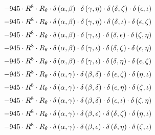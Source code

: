 \begin{subequations}
\begin{gather}
 \\[0.2em] \notag 		 - 945 \cdot R^{8} \cdot R_{\theta{}} \cdot \delta{}\left(\alpha{}, \beta{}\right) \cdot \delta{}\left(\gamma{}, \eta{}\right) \cdot \delta{}\left(\delta{}, \zeta{}\right) \cdot \delta{}\left(\epsilon{}, \iota{}\right) 
 \\[0.2em] \notag 		 - 945 \cdot R^{8} \cdot R_{\theta{}} \cdot \delta{}\left(\alpha{}, \beta{}\right) \cdot \delta{}\left(\gamma{}, \eta{}\right) \cdot \delta{}\left(\delta{}, \iota{}\right) \cdot \delta{}\left(\epsilon{}, \zeta{}\right) 
 \\[0.2em] \notag 		 - 945 \cdot R^{8} \cdot R_{\theta{}} \cdot \delta{}\left(\alpha{}, \beta{}\right) \cdot \delta{}\left(\gamma{}, \iota{}\right) \cdot \delta{}\left(\delta{}, \epsilon{}\right) \cdot \delta{}\left(\zeta{}, \eta{}\right) 
 \\[0.2em] \notag 		 - 945 \cdot R^{8} \cdot R_{\theta{}} \cdot \delta{}\left(\alpha{}, \beta{}\right) \cdot \delta{}\left(\gamma{}, \iota{}\right) \cdot \delta{}\left(\delta{}, \zeta{}\right) \cdot \delta{}\left(\epsilon{}, \eta{}\right) 
 \\[0.2em] \notag 		 - 945 \cdot R^{8} \cdot R_{\theta{}} \cdot \delta{}\left(\alpha{}, \beta{}\right) \cdot \delta{}\left(\gamma{}, \iota{}\right) \cdot \delta{}\left(\delta{}, \eta{}\right) \cdot \delta{}\left(\epsilon{}, \zeta{}\right) 
 \\[0.2em] \notag 		 - 945 \cdot R^{8} \cdot R_{\theta{}} \cdot \delta{}\left(\alpha{}, \gamma{}\right) \cdot \delta{}\left(\beta{}, \delta{}\right) \cdot \delta{}\left(\epsilon{}, \zeta{}\right) \cdot \delta{}\left(\eta{}, \iota{}\right) 
 \\[0.2em] \notag 		 - 945 \cdot R^{8} \cdot R_{\theta{}} \cdot \delta{}\left(\alpha{}, \gamma{}\right) \cdot \delta{}\left(\beta{}, \delta{}\right) \cdot \delta{}\left(\epsilon{}, \eta{}\right) \cdot \delta{}\left(\zeta{}, \iota{}\right) 
 \\[0.2em] \notag 		 - 945 \cdot R^{8} \cdot R_{\theta{}} \cdot \delta{}\left(\alpha{}, \gamma{}\right) \cdot \delta{}\left(\beta{}, \delta{}\right) \cdot \delta{}\left(\epsilon{}, \iota{}\right) \cdot \delta{}\left(\zeta{}, \eta{}\right) 
 \\[0.2em] \notag 		 - 945 \cdot R^{8} \cdot R_{\theta{}} \cdot \delta{}\left(\alpha{}, \gamma{}\right) \cdot \delta{}\left(\beta{}, \epsilon{}\right) \cdot \delta{}\left(\delta{}, \zeta{}\right) \cdot \delta{}\left(\eta{}, \iota{}\right) 
 \\[0.2em] \notag 		 - 945 \cdot R^{8} \cdot R_{\theta{}} \cdot \delta{}\left(\alpha{}, \gamma{}\right) \cdot \delta{}\left(\beta{}, \epsilon{}\right) \cdot \delta{}\left(\delta{}, \eta{}\right) \cdot \delta{}\left(\zeta{}, \iota{}\right) 

\end{gather}
\end{subequations}
